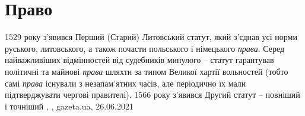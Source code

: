  
 
 
 
 
\chapter{Право}

1529 року з'явився Перший (Старий) Литовський статут, який з'єднав усі норми
руського, литовського, а також почасти польського і німецького \emph{права}. Серед
найважливіших відмінностей від судебників минулого – статут гарантував
політичні та майнові \emph{права} шляхти за типом Великої хартії вольностей (тобто
самі \emph{права} існували з незапам'ятних часів, але періодично їх мали
підтверджувати чергові правителі). 1566 року з'явився Другий статут – повніший
і точніший
, 
, gazeta.ua, 26.06.2021
